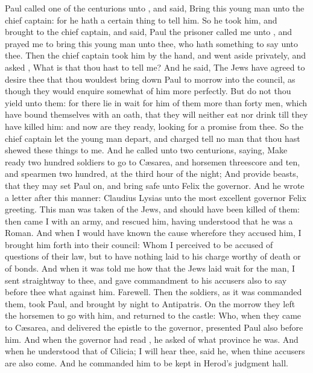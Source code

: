 {Paul
called
one of the
centurions unto
{}, and
said,
Bring
this young
man
unto the chief
captain:
for he
hath a certain
thing to
tell
him.
So he
took
him, and
brought
{}
to the chief
captain,
and
said,
Paul the
prisoner
called
me
unto
{}, and prayed
me to
bring
this young
man
unto
thee, who
hath
something to
say unto
thee.
Then the chief
captain
took
him by the
hand,
and
went
{}
aside
privately, and
asked
{},
What
is
that thou
hast to
tell
me?
And he
said, The
Jews have
agreed to
desire
thee
that thou wouldest bring
down
Paul to
morrow
into the
council, as
though they would
enquire
somewhat
of
him
more
perfectly.
But
do
not
thou
yield unto
them:
for there lie in
wait for
him
of
them
more than
forty
men,
which have
bound
themselves with an
oath,
that they
will
neither
eat
nor
drink
till they have
killed
him:
and
now are
they
ready, looking
for a
promise
from
thee.
So the chief
captain
{}
let the young
man
depart, and
charged
{}
tell no
man
that thou hast
shewed these
things
to
me.
And
he
called unto
{}
two
centurions,
saying, Make
ready two
hundred
soldiers
to
go
to
Cæsarea,
and
horsemen threescore and
ten,
and
spearmen two
hundred,
at the
third
hour of the
night;
And
provide
{}
beasts,
that they may
set
Paul
on, and
bring
{}
safe
unto
Felix the
governor.
And he
wrote a
letter
after
this
manner:
Claudius
Lysias unto the most
excellent
governor
Felix
{}
greeting.
This
man was
taken
of the
Jews,
and
should have been
killed
of
them: then came
I
with an
army, and
rescued
him, having
understood
that he
was a
Roman.
And when I
would have
known the
cause
wherefore they
accused
him, I
brought
him
forth
into
their
council:
Whom I
perceived to be
accused
of
questions of
their
law,
but to
have
nothing laid to his
charge
worthy of
death
or of
bonds.
And when it was
told
me
how
that the
Jews laid
wait
for the
man, I
sent
straightway
to
thee, and gave
commandment to his
accusers
also to
say
before
thee
what
{}
against
him.
Farewell.
Then the
soldiers,
as it was
commanded
them,
took
Paul, and
brought
{}
by
night
to
Antipatris.
On the
morrow they
left the
horsemen to
go
with
him, and
returned
to the
castle:
Who, when they
came
to
Cæsarea,
and
delivered the
epistle to the
governor,
presented
Paul
also before
him.
And
when the
governor had
read
{}, he
asked
of
what
province he
was.
And when he
understood
that
{}
of
Cilicia;
I will
hear
thee, said
he,
when
thine
accusers are
also
come.
And he
commanded
him to be
kept
in
Herod’s judgment
hall.

}
